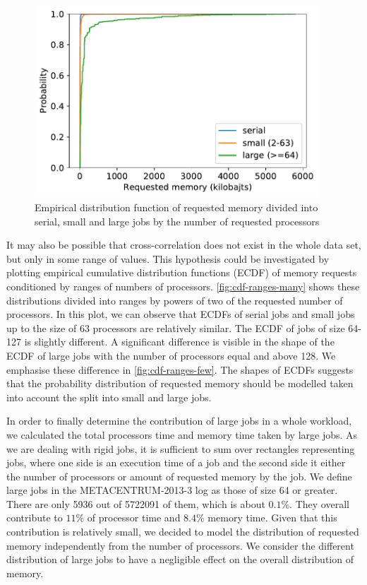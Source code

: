 \documentclass[thesis-en.tex]{subfiles}
\begin{document}
\begin{figure}[p]
    \centering
    \includegraphics[width=0.95\textwidth]{images/cdf_ranges_few.pdf}
    \caption{Empirical distribution function of requested memory divided into serial, small and large jobs by the number of requested processors}
    \label{fig:cdf-ranges-few}
\end{figure}

It may also be possible that cross-correlation does not  exist in the whole data set, but only in some range of values. This hypothesis could be investigated by plotting empirical cumulative distribution functions (ECDF) of memory requests conditioned by ranges of numbers of processors. \autoref{fig:cdf-ranges-many} shows these distributions divided into ranges by powers of two of the requested number of processors. In this plot, we can observe that ECDFs of serial jobs and small jobs up to the size of 63 processors are relatively similar. The ECDF of jobs of size 64-127 is slightly different. A significant difference is visible in the shape of the ECDF of large jobs with the number of processors equal and above 128. We emphasise these difference in \autoref{fig:cdf-ranges-few}. The shapes of ECDFs suggests that the probability distribution of requested memory should be modelled taken into account the split into small and large jobs.

In order to finally determine the contribution of large jobs in a whole workload, we calculated the total processors time and memory time taken by large jobs. As we are dealing with rigid jobs, it is sufficient to sum over rectangles representing jobs, where one side is an execution time of a job and the second side it either the number of processors or amount of requested memory by the job. We define large jobs in the METACENTRUM-2013-3 log as those of size 64 or greater. There are only 5936 out of 5722091 of them, which is about $0.1\%$. They overall contribute to $11\%$ of processor time and $8.4\%$ memory time. Given that this contribution is relatively small, we decided to model the distribution of requested memory independently from the number of processors. We consider the different distribution of large jobs to have a negligible effect on the overall distribution of memory.
\end{document}
